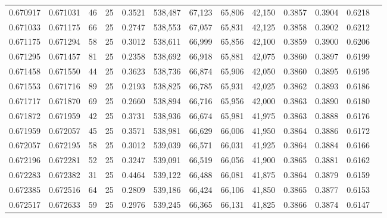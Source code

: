 \begin{tabular}{rrrrrrrrrrrrr}
0.670917 & 0.671031 &    46 &  25 &                                     0.3521 & 538,487 &  67,123 &  65,806 &  42,150 & 0.3857 & 0.3904 & 0.6218 \\
0.671033 & 0.671175 &    66 &  25 &                                     0.2747 & 538,553 &  67,057 &  65,831 &  42,125 & 0.3858 & 0.3902 & 0.6212 \\
0.671175 & 0.671294 &    58 &  25 &                                     0.3012 & 538,611 &  66,999 &  65,856 &  42,100 & 0.3859 & 0.3900 & 0.6206 \\
0.671295 & 0.671457 &    81 &  25 &                                     0.2358 & 538,692 &  66,918 &  65,881 &  42,075 & 0.3860 & 0.3897 & 0.6199 \\
0.671458 & 0.671550 &    44 &  25 &                                     0.3623 & 538,736 &  66,874 &  65,906 &  42,050 & 0.3860 & 0.3895 & 0.6195 \\
0.671553 & 0.671716 &    89 &  25 &                                     0.2193 & 538,825 &  66,785 &  65,931 &  42,025 & 0.3862 & 0.3893 & 0.6186 \\
0.671717 & 0.671870 &    69 &  25 &                                     0.2660 & 538,894 &  66,716 &  65,956 &  42,000 & 0.3863 & 0.3890 & 0.6180 \\
0.671872 & 0.671959 &    42 &  25 &                                     0.3731 & 538,936 &  66,674 &  65,981 &  41,975 & 0.3863 & 0.3888 & 0.6176 \\
0.671959 & 0.672057 &    45 &  25 &                                     0.3571 & 538,981 &  66,629 &  66,006 &  41,950 & 0.3864 & 0.3886 & 0.6172 \\
0.672057 & 0.672195 &    58 &  25 &                                     0.3012 & 539,039 &  66,571 &  66,031 &  41,925 & 0.3864 & 0.3884 & 0.6166 \\
0.672196 & 0.672281 &    52 &  25 &                                     0.3247 & 539,091 &  66,519 &  66,056 &  41,900 & 0.3865 & 0.3881 & 0.6162 \\
0.672283 & 0.672382 &    31 &  25 &                                     0.4464 & 539,122 &  66,488 &  66,081 &  41,875 & 0.3864 & 0.3879 & 0.6159 \\
0.672385 & 0.672516 &    64 &  25 &                                     0.2809 & 539,186 &  66,424 &  66,106 &  41,850 & 0.3865 & 0.3877 & 0.6153 \\
0.672517 & 0.672633 &    59 &  25 &                                     0.2976 & 539,245 &  66,365 &  66,131 &  41,825 & 0.3866 & 0.3874 & 0.6147 \\

\end{tabular}
